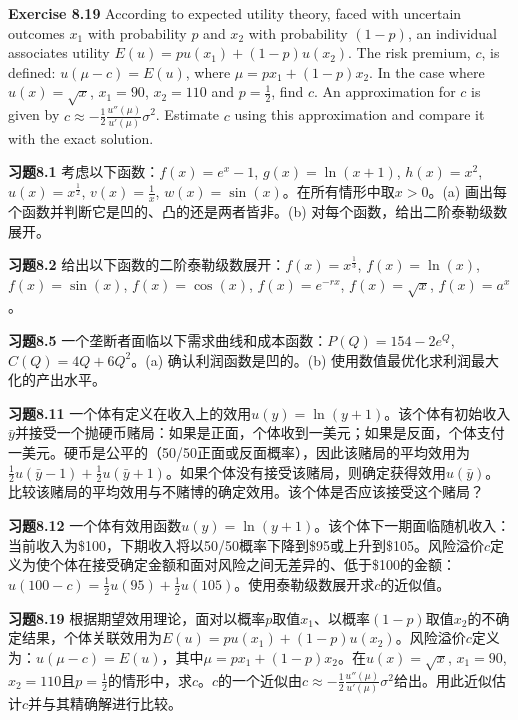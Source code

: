 \begin{original}
\textbf{Exercise 8.19} According to expected utility theory, faced with uncertain outcomes $x_1$ with probability $p$ and $x_2$ with probability $(1-p)$, an individual associates utility $E(u) = p u(x_1) + (1-p)u(x_2)$. The risk premium, $c$, is defined: $u(\mu - c) = E(u)$, where $\mu = p x_1 + (1-p)x_2$. In the case where $u(x) = \sqrt{x}$, $x_1 = 90$, $x_2 = 110$ and $p = \frac{1}{2}$, find $c$. An approximation for $c$ is given by $c \approx -\frac{1}{2}\frac{u''(\mu)}{u'(\mu)}\sigma^2$. Estimate $c$ using this approximation and compare it with the exact solution.
\end{original}
\begin{translation}
\textbf{习题8.1} 考虑以下函数：$f(x) = e^x - 1$, $g(x) = \ln(x + 1)$, $h(x) = x^2$, $u(x) = x^{\frac{1}{2}}$, $v(x) = \frac{1}{x}$, $w(x) = \sin(x)$。在所有情形中取$x > 0$。(a) 画出每个函数并判断它是凹的、凸的还是两者皆非。(b) 对每个函数，给出二阶泰勒级数展开。

\textbf{习题8.2} 给出以下函数的二阶泰勒级数展开：$f(x) = x^{\frac{1}{3}}$, $f(x) = \ln(x)$, $f(x) = \sin(x)$, $f(x) = \cos(x)$, $f(x) = e^{-rx}$, $f(x) = \sqrt{x}$, $f(x) = a^x$。

\textbf{习题8.5} 一个垄断者面临以下需求曲线和成本函数：$P(Q) = 154 - 2e^Q$, $C(Q) = 4Q + 6Q^2$。(a) 确认利润函数是凹的。(b) 使用数值最优化求利润最大化的产出水平。

\textbf{习题8.11} 一个体有定义在收入上的效用$u(y) = \ln(y + 1)$。该个体有初始收入$\bar{y}$并接受一个抛硬币赌局：如果是正面，个体收到一美元；如果是反面，个体支付一美元。硬币是公平的（50/50正面或反面概率），因此该赌局的平均效用为$\frac{1}{2}u(\bar{y} - 1) + \frac{1}{2}u(\bar{y} + 1)$。如果个体没有接受该赌局，则确定获得效用$u(\bar{y})$。比较该赌局的平均效用与不赌博的确定效用。该个体是否应该接受这个赌局？

\textbf{习题8.12} 一个体有效用函数$u(y) = \ln(y + 1)$。该个体下一期面临随机收入：当前收入为\$100，下期收入将以50/50概率下降到\$95或上升到\$105。风险溢价$c$定义为使个体在接受确定金额和面对风险之间无差异的、低于\$100的金额：$u(100 - c) = \frac{1}{2}u(95) + \frac{1}{2}u(105)$。使用泰勒级数展开求$c$的近似值。

\textbf{习题8.19} 根据期望效用理论，面对以概率$p$取值$x_1$、以概率$(1-p)$取值$x_2$的不确定结果，个体关联效用为$E(u) = p u(x_1) + (1-p)u(x_2)$。风险溢价$c$定义为：$u(\mu - c) = E(u)$，其中$\mu = p x_1 + (1-p)x_2$。在$u(x) = \sqrt{x}$, $x_1 = 90$, $x_2 = 110$且$p = \frac{1}{2}$的情形中，求$c$。$c$的一个近似由$c \approx -\frac{1}{2}\frac{u''(\mu)}{u'(\mu)}\sigma^2$给出。用此近似估计$c$并与其精确解进行比较。
\end{translation}

